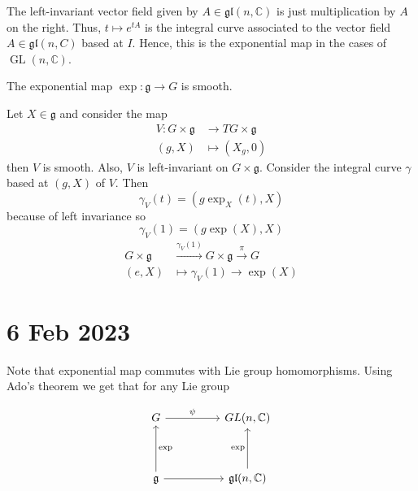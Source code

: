 \documentclass[11pt,a4paper]{scrarticle}
\theoremstyle{definition}
\renewenvironment{proof}[1][\proofname]{\vspace{-15pt}\begin{myproof}}{\end{myproof}}
\theoremstyle{greenbox}
\newcommand{\C}{\mathbb{C}}
\newcommand{\fg}{\mathfrak{g}}
\begin{document}
The left-invariant vector field given by $ A \in \mathfrak{gl}(n,\C) $ is just  multiplication by $ A $ on the right. Thus, $ t \mapsto e^{tA} $ is the integral curve associated to the vector field $ A \in \mathfrak{gl}(n,C) $ based at $ I $. Hence, this is the exponential map in the cases of $ \operatorname{GL}(n,\C) $.

\begin{thm}
    The exponential map $ \exp : \mathfrak{g} \to G $ is smooth.
\end{thm}
\begin{proof}
    Let $ X \in \mathfrak{g} $ and consider the map \begin{align*}
        V : G \times \fg & \to TG \times \fg \\
        (g,X) & \mapsto (X_{g},0)
    \end{align*}
    then $ V $ is smooth. Also, $ V $ is left-invariant on $ G \times \fg $. Consider the integral curve $ \gamma  $ based at $ (g,X) $ of $ V $. Then 
    \[ \gamma_{V}(t) = (g \exp_{X}(t),X) \]
    because of left invariance so 
    \[ \gamma_{V}(1) = (g \exp(X),X) \]
    \begin{align*}
        G \times \fg & \xrightarrow{\gamma_{V}(1)} G \times \fg \xrightarrow{\pi} G \\
        (e,X) & \mapsto \gamma_{V}(1) \to \exp(X)
    \end{align*}
\end{proof}

\section{6 Feb 2023}

Note that exponential map commutes with Lie group homomorphisms. Using Ado's theorem we get that for any Lie group

\[\begin{tikzcd}[ampersand replacement=\&]
	G \&\& {GL(n,\mathbb{C})} \\
	\\
	{\mathfrak{g}} \&\& {\mathfrak{gl}(n,\mathbb{C})}
	\arrow[from=3-1, to=3-3]
	\arrow["\exp", from=3-3, to=1-3]
	\arrow["\exp"', from=3-1, to=1-1]
	\arrow["\psi", from=1-1, to=1-3]
\end{tikzcd}\]
\end{document}
